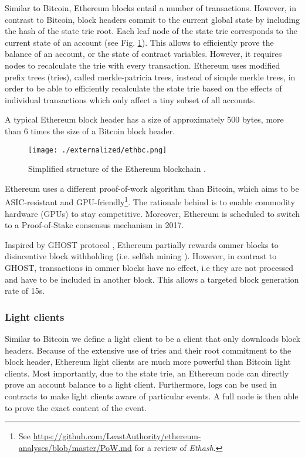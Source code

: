 Similar to Bitcoin, Ethereum blocks entail a number of transactions. However, in contrast to Bitcoin, block headers commit to the current global state by including the hash of the state trie root. Each leaf node of the state trie corresponds to the current state of an account (see Fig. \ref{fig:ethbc}). This allows to efficiently prove the balance of an account, or the state of contract variables. However, it requires nodes to recalculate the trie with every transaction. Ethereum uses modified prefix trees (tries), called merkle-patricia trees, instead of simple merkle trees, in order to be able to efficiently recalculate the state trie based on the effects of individual transactions which only affect a tiny subset of all accounts.

A typical Ethereum block header has a size of approximately 500 bytes, more than 6 times the size of a Bitcoin block header.


\begin{figure}[!t]
    \centering
    \texttt{[image: ./externalized/ethbc.png]}
    \caption{Simplified structure of the Ethereum blockchain \parencite{EthDevTut}.}
    \label{fig:ethbc}
  \end{figure} 

 Ethereum uses a different proof-of-work algorithm than Bitcoin, which aims to be ASIC-resistant and GPU-friendly\footnote{See \url{https://github.com/LeastAuthority/ethereum-analyses/blob/master/PoW.md} for a review of \emph{Ethash}.}. The rationale behind is to enable commodity hardware (GPUs) to stay competitive. Moreover, Ethereum is scheduled to switch to a Proof-of-Stake consensus mechanism in 2017. 

Inspired by \ac{GHOST} protocol \parencite{cryptoeprint:2013:881}, Ethereum partially rewards ommer blocks to disincentive block withholding (i.e. selfish mining \parencite{Eyal2014}). However, in contrast to \ac{GHOST}, transactions in ommer blocks have no effect, i.e they are not processed and have to be included in another block. This allows a targeted block generation rate of 15s.  

\subsubsection{Light clients}
\label{sec:eth_lightclient}

Similar to Bitcoin we define a light client to be a client that only downloads block headers. Because of the extensive use of tries and their root commitment to the block header, Ethereum light clients are much more powerful than Bitcoin light clients. 
Most importantly, due to the state trie, an Ethereum node can directly prove an account balance to a light client. Furthermore, logs can be used in contracts to make light clients aware of particular events. A full node is then able to prove the exact content of the event.

